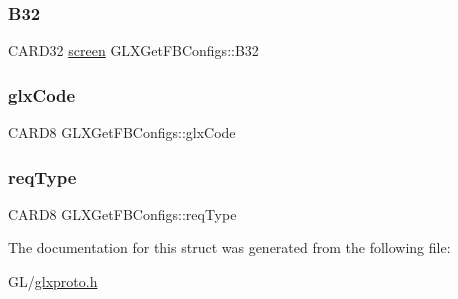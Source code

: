 \subsubsection{\texorpdfstring{B32}{B32}}
{\footnotesize\ttfamily C\+A\+R\+D32 \hyperlink{cad_8h_ae04e09e4e3831bfc1632c509ae37dcec}{screen} G\+L\+X\+Get\+F\+B\+Configs\+::\+B32}

\mbox{\label{struct_g_l_x_get_f_b_configs_a5d1d4d5f8c81ca65a264fd3bbbc2f7ee}} 
\subsubsection{\texorpdfstring{glx\+Code}{glxCode}}
{\footnotesize\ttfamily C\+A\+R\+D8 G\+L\+X\+Get\+F\+B\+Configs\+::glx\+Code}

\mbox{\label{struct_g_l_x_get_f_b_configs_a982a93cf6875b4d9502404e6e06d276c}} 
\subsubsection{\texorpdfstring{req\+Type}{reqType}}
{\footnotesize\ttfamily C\+A\+R\+D8 G\+L\+X\+Get\+F\+B\+Configs\+::req\+Type}



The documentation for this struct was generated from the following file\+:\begin{DoxyCompactItemize}
\item 
G\+L/\hyperlink{glxproto_8h}{glxproto.\+h}\end{DoxyCompactItemize}
